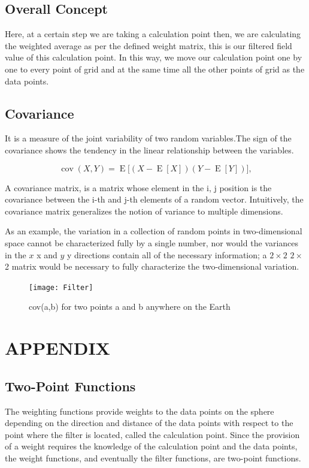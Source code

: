 \documentclass[a4paper,12pt]{report}
\begin{document}
\section{Overall Concept}
 Here, at a certain step we are taking a calculation point then, we are calculating the weighted average as per the defined weight matrix, this is our filtered field value of this calculation point. In this way, we move our calculation point one by one to every point of grid and at the same time all the other points of grid as the data points.     
 
 
\section{Covariance}
It is a measure of the joint variability of two random variables.The sign of the covariance shows the tendency in the linear relationship between the variables.
 

$$
{\displaystyle \operatorname {cov} (X,Y)=\operatorname {E} {{\big [}(X-\operatorname {E} [X])(Y-\operatorname {E} [Y]){\big ]}},} 
$$

 A covariance matrix, is a matrix whose element in the i, j position is the covariance between the i-th and j-th elements of a random vector.
 Intuitively, the covariance matrix generalizes the notion of variance to multiple dimensions.
 
 As an example, the variation in a collection of random points in two-dimensional space cannot be characterized fully by a single number, nor would the variances in the ${\displaystyle x}$ x and $ {\displaystyle y}$ y directions contain all of the necessary information; a ${\displaystyle 2\times 2}$ $ 2\times$ 2 matrix would be necessary to fully characterize the two-dimensional variation.

\begin{figure}[!h]
	\advance\leftskip-3cm
    \texttt{[image: Filter]}
    \caption{cov(a,b) for two points a and b anywhere on the Earth}
\end{figure}

\chapter{APPENDIX}

\section{Two-Point Functions}
The weighting functions provide weights to the data
points on the sphere depending on the direction and distance of the data points with respect to the
point where the filter is located, called the calculation point. Since the provision of a weight requires
the knowledge of the calculation point and the data points, the weight functions, and eventually
the filter functions, are two-point functions.
\end{document}
